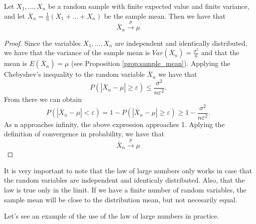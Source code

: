 \begin{theorem}
\label{th:law_large_numbers}
Let $X_1, \ldots, X_n$ be a random sample with finite expected value and finite variance, and let $\overline {X}_n = \frac {1}{n} \left( X_1 + \ldots + X_n \right)$ be the sample mean. Then we have that
\[
\overline {X}_n \overset{p}{\rightarrow} \mu
\]
\end{theorem}
\begin{proof}
Since the variables $X_1, \ldots, X_n$ are independent and identically distributed, we have that the variance of the sample mean is $Var \left( \overline {X}_n \right) = \frac{\sigma^2}{n}$ and that the mean is $E \left( \overline {X}_n \right) = \mu$ (see Proposition \ref{prop:sample_mean}). Applying the Chebyshev's inequality to the random variable $\overline {X}_n$ we have that
\[
P \left( \left| \overline {X}_n- \mu \right| \geq \varepsilon \right) \leq \frac{\sigma ^2}{n \varepsilon^2}.
\]
From there we can obtain
\[
P \left( \left| \overline {X}_n - \mu \right| < \varepsilon \right) = 1 - P \left( \left| \overline {X}_n - \mu \right| \geq \varepsilon \right) \geq 1 - \frac{\sigma ^2}{n \varepsilon^2}.
\]
As n approaches infinity, the above expression approaches 1. Aplying the definition of convergence in probability, we have that
\[
\overline{X}_n \overset{p}{\rightarrow} \mu
\]
\end{proof}

It is very important to note that the law of large numbers only works in case that the random variables are independent and identicaly distributed. Also, that the law is true only in the limit. If we have a finite number of random variables, the sample mean will be close to the distribution mean, but not necesarily equal.

Let's see an example of the use of the law of large numbers in practice.


